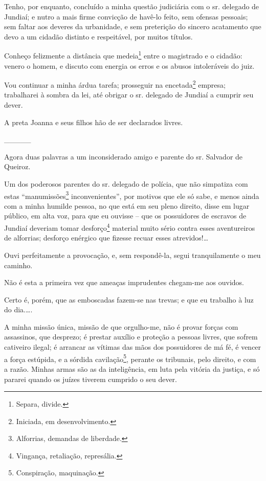 \asterisc{}

Tenho, por enquanto, concluído a minha questão judiciária com o sr.
delegado de Jundiaí; e nutro a mais firme convicção de havê-lo feito,
sem ofensas pessoais; sem faltar aos deveres da urbanidade, e sem
preterição do sincero acatamento que devo a um cidadão distinto e
respeitável, por muitos títulos.

Conheço felizmente a distância que medeia\footnote{ Separa, divide.}
entre o magistrado e o cidadão: venero o homem, e discuto com energia os
erros e os abusos intoleráveis do juiz.

Vou continuar a minha árdua tarefa; prosseguir na encetada\footnote{
  Iniciada, em desenvolvimento.} empresa; trabalharei à sombra da lei,
até obrigar o sr. delegado de Jundiaí a cumprir seu dever.

A preta Joanna e seus filhos hão de ser declarados livres.

\_\_\_\_\_

Agora duas palavras a um inconsiderado amigo e parente do sr. Salvador
de Queiroz.

Um dos poderosos parentes do sr. delegado de polícia, que não simpatiza
com estas ``manumissões\footnote{ Alforrias, demandas de liberdade.}
inconvenientes'', por motivos que ele só sabe, e menos ainda com a minha
humilde pessoa, no que está em seu pleno direito, disse em lugar
público, em alta voz, para que eu ouvisse -- que os possuidores de
escravos de Jundiaí deveriam tomar desforço\footnote{ Vingança,
  retaliação, represália.} material muito sério contra esses
aventureiros de alforrias; desforço enérgico que fizesse recuar esses
atrevidos!\ldots{}

Ouvi perfeitamente a provocação, e, sem respondê-la, segui
tranquilamente o meu caminho.

Não é esta a primeira vez que ameaças imprudentes chegam-me aos
ouvidos.

Certo é, porém, que as emboscadas fazem-se nas trevas; e que eu trabalho
à luz do dia.\ldots.

A minha missão única, missão de que orgulho-me, não é provar forças com
assassinos, que desprezo; é prestar auxílio e proteção a pessoas livres,
que sofrem cativeiro ilegal; é arrancar as vítimas das mãos dos
possuidores de má fé, é vencer a força estúpida, e a sórdida
cavilação\footnote{ Conspiração, maquinação.}, perante os tribunais,
pelo direito, e com a razão. Minhas armas são as da inteligência, em
luta pela vitória da justiça, e só pararei quando os juízes tiverem
cumprido o seu dever.

